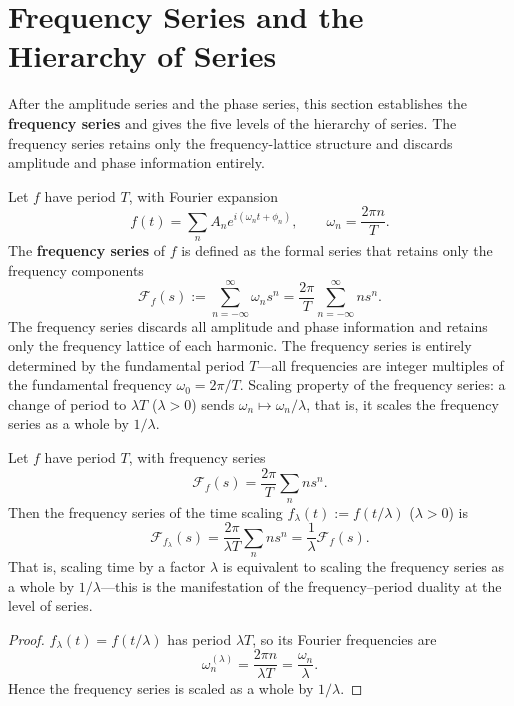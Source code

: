 \section{\texorpdfstring{Frequency Series and the Hierarchy of Series}{Frequency Series and the Hierarchy of Series}}

After the amplitude series and the phase series, this section establishes the \textbf{frequency series} and gives the five levels of the hierarchy of series. The frequency series retains only the frequency-lattice structure and discards amplitude and phase information entirely.

\begin{definition}\label{def:frequency_series}
Let $f$ have period $T$, with Fourier expansion
\[
f(t)=\sum_{n} A_n e^{i(\omega_n t+\phi_n)}, \qquad \omega_n=\frac{2\pi n}{T}.
\]
The \textbf{frequency series} of $f$ is defined as the formal series that retains only the frequency components
\[
\mathcal{F}_f(s) := \sum_{n=-\infty}^{\infty} \omega_n s^n
= \frac{2\pi}{T}\sum_{n=-\infty}^{\infty} n s^n.
\]
The frequency series discards all amplitude and phase information and retains only the frequency lattice of each harmonic. The frequency series is entirely determined by the fundamental period $T$---all frequencies are integer multiples of the fundamental frequency $\omega_0=2\pi/T$. Scaling property of the frequency series: a change of period to $\lambda T$ ($\lambda>0$) sends $\omega_n\mapsto \omega_n/\lambda$, that is, it scales the frequency series as a whole by $1/\lambda$.
\end{definition}

\begin{proposition}\label{prop:frequency_scaling}
Let $f$ have period $T$, with frequency series
\[
\mathcal{F}_f(s)=\frac{2\pi}{T}\sum_n n s^n.
\]
Then the frequency series of the time scaling $f_\lambda(t):=f(t/\lambda)$ ($\lambda>0$) is
\[
\mathcal{F}_{f_\lambda}(s)
= \frac{2\pi}{\lambda T}\sum_n n s^n
= \frac{1}{\lambda}\mathcal{F}_f(s).
\]
That is, scaling time by a factor $\lambda$ is equivalent to scaling the frequency series as a whole by $1/\lambda$---this is the manifestation of the frequency--period duality at the level of series.
\end{proposition}

\begin{proof}
$f_\lambda(t)=f(t/\lambda)$ has period $\lambda T$, so its Fourier frequencies are
\[
\omega_n^{(\lambda)}=\frac{2\pi n}{\lambda T}=\frac{\omega_n}{\lambda}.
\]
Hence the frequency series is scaled as a whole by $1/\lambda$.
\end{proof}

